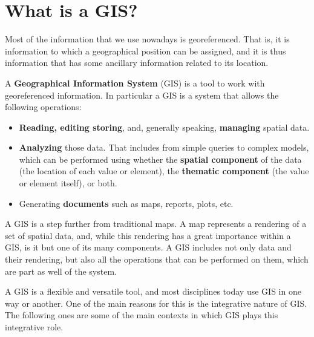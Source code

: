 
\chapter{What is a GIS?}

\pagestyle{fancy}

Most of the information that we use nowadays is georeferenced. That is, it is information to which a geographical position can be assigned, and it is thus information that has some ancillary information related to its location.

A \textbf{Geographical Information System} (GIS) is a tool to work with georeferenced information. In particular a GIS is a system that allows the following operations:

\begin{itemize}
	\item \textbf{Reading, editing storing}, and, generally speaking, \textbf{managing} spatial data.
	\item \textbf{Analyzing} those data. That includes from simple queries to complex models, which can be performed using whether the \textbf{spatial component} of the data (the location of each value or element), the \textbf{thematic component} (the value or element itself), or both.
	\item Generating \textbf{documents} such as maps, reports, plots, etc.
\end{itemize}


A GIS is a step further from traditional maps. A map represents a rendering of a set of spatial data, and, while this rendering has a great importance within a GIS, is it but one of its many components. A GIS includes not only data and their rendering, but also all the operations that can be performed on them, which are part as well of the system.

A GIS is a flexible and versatile tool, and most disciplines today use GIS in one way or another. One of the main reasons for this is the integrative nature of GIS. The following ones are some of the main contexts in which GIS plays this integrative role.



